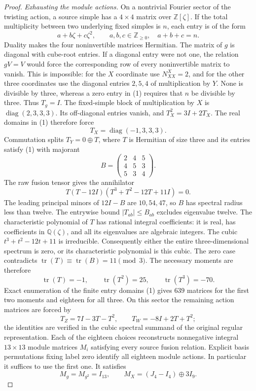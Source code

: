 \begin{proof}
\emph{Exhausting the module actions.}
On a nontrivial Fourier sector of the twisting action, a source
simple has a $4\times4$ matrix over $\mathbb Z[\zeta]$.
If the total multiplicity between two underlying fixed simples is
$n$, each entry is of the form
\[
 a+b\zeta+c\zeta^2,\qquad a,b,c\in\mathbb Z_{\geq0},\quad a+b+c=n.
 \tag{1}\label{eq:4982-Fourier-domain}
\]
Duality makes the four noninvertible matrices Hermitian. The matrix
of $g$ is diagonal with cube-root entries. If a diagonal entry were
not one, the relation $gV=V$ would force the corresponding row of
every noninvertible matrix to vanish. This is impossible: for the
$X$ coordinate use $N_{XX}^X=2$, and for the other three coordinates
use the diagonal entries $2,5,4$ of multiplication by $Y$. None is
divisible by three, whereas a zero entry in (1) requires that
$n$ be divisible by three. Thus $T_g=I$.
The fixed-simple block of multiplication by $X$ is
$\operatorname{diag}(2,3,3,3)$. Its off-diagonal entries vanish, and
$T_X^2=3I+2T_X$. The real domains in (1) therefore force
\[
 T_X=\operatorname{diag}(-1,3,3,3).
\]
Commutation splits $T_Y=0\oplus T$, where $T$ is Hermitian of size
three and its entries satisfy (1) with majorant
\[
 B=\begin{pmatrix}2&4&5\\4&5&3\\5&3&4\end{pmatrix}.
\]
The raw fusion tensor gives the annihilator
\[
 T(T-12I)(T^3+T^2-12T+11I)=0.
\]
The leading principal minors of $12I-B$ are $10,54,47$, so $B$
has spectral radius less than twelve. The entrywise bound
$|T_{ab}|\leq B_{ab}$ excludes eigenvalue twelve.
The characteristic polynomial of $T$ has rational integral
coefficients: it is real, has coefficients in $\mathbb Q(\zeta)$,
and all its eigenvalues are algebraic integers. The cubic
$t^3+t^2-12t+11$ is irreducible. Consequently either the entire
three-dimensional spectrum is zero, or its characteristic polynomial
is this cubic. The zero case contradicts
$\operatorname{tr}(T)\equiv\operatorname{tr}(B)=11\pmod3$.
The necessary moments are therefore
\[
 \operatorname{tr}(T)=-1,\qquad
 \operatorname{tr}(T^2)=25,\qquad
 \operatorname{tr}(T^3)=-70.
\]
Exact enumeration of the finite entry domains (1) gives $639$
matrices for the first two moments and eighteen for all three.
On this sector the remaining action matrices are forced by
\[
 T_Z=7I-3T-T^2,\qquad T_W=-8I+2T+T^2;
\]
the identities are verified in the cubic spectral summand of the
original regular representation. Each of the eighteen choices
reconstructs nonnegative integral $13\times13$ module matrices
$M_i$ satisfying every source fusion relation. Explicit basis
permutations fixing label zero identify all eighteen module actions.
In particular it suffices to use the first one. It satisfies
\[
 M_g=M_{g^2}=I_{13},\qquad
 M_X=(J_4-I_4)\oplus3I_9.
\]


\end{proof}
